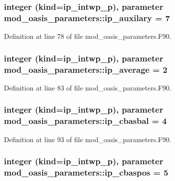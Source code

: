 \hypertarget{classmod__oasis__parameters_a4e90463865a09309212e947e8c8546ac}{
\subsubsection[{ip\+\_\+auxilary}]{\setlength{\rightskip}{0pt plus 5cm}integer (kind=ip\+\_\+intwp\+\_\+p), parameter mod\+\_\+oasis\+\_\+parameters\+::ip\+\_\+auxilary = 7}}\label{classmod__oasis__parameters_a4e90463865a09309212e947e8c8546ac}


Definition at line 78 of file mod\+\_\+oasis\+\_\+parameters.\+F90.

\hypertarget{classmod__oasis__parameters_a5e40e91da22fca8f2b6a9d4f1c1ace5d}{
\subsubsection[{ip\+\_\+average}]{\setlength{\rightskip}{0pt plus 5cm}integer (kind=ip\+\_\+intwp\+\_\+p), parameter mod\+\_\+oasis\+\_\+parameters\+::ip\+\_\+average = 2}}\label{classmod__oasis__parameters_a5e40e91da22fca8f2b6a9d4f1c1ace5d}


Definition at line 83 of file mod\+\_\+oasis\+\_\+parameters.\+F90.

\hypertarget{classmod__oasis__parameters_aaa7ead98ff7d53acfd539a32fca9e2c7}{
\subsubsection[{ip\+\_\+cbasbal}]{\setlength{\rightskip}{0pt plus 5cm}integer (kind=ip\+\_\+intwp\+\_\+p), parameter mod\+\_\+oasis\+\_\+parameters\+::ip\+\_\+cbasbal = 4}}\label{classmod__oasis__parameters_aaa7ead98ff7d53acfd539a32fca9e2c7}


Definition at line 93 of file mod\+\_\+oasis\+\_\+parameters.\+F90.

\hypertarget{classmod__oasis__parameters_a3b96d31bbe142d84df2b93880498936f}{
\subsubsection[{ip\+\_\+cbaspos}]{\setlength{\rightskip}{0pt plus 5cm}integer (kind=ip\+\_\+intwp\+\_\+p), parameter mod\+\_\+oasis\+\_\+parameters\+::ip\+\_\+cbaspos = 5}}\label{classmod__oasis__parameters_a3b96d31bbe142d84df2b93880498936f}


